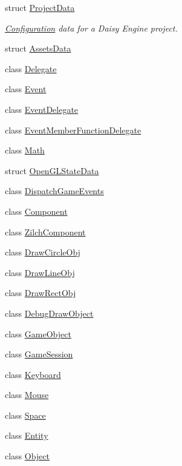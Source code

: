 \begin{DoxyCompactItemize}
struct \hyperlink{structDCEngine_1_1ProjectData}{Project\-Data}
\begin{DoxyCompactList}\small\item\em \hyperlink{structConfiguration}{Configuration} data for a Daisy Engine project. \end{DoxyCompactList}\item 
struct \hyperlink{structDCEngine_1_1AssetsData}{Assets\-Data}
\item 
class \hyperlink{classDCEngine_1_1Delegate}{Delegate}
\item 
class \hyperlink{classDCEngine_1_1Event}{Event}
\item 
class \hyperlink{classDCEngine_1_1EventDelegate}{Event\-Delegate}
\item 
class \hyperlink{classDCEngine_1_1EventMemberFunctionDelegate}{Event\-Member\-Function\-Delegate}
\item 
class \hyperlink{classDCEngine_1_1Math}{Math}
\item 
struct \hyperlink{structDCEngine_1_1OpenGLStateData}{Open\-G\-L\-State\-Data}
\item 
class \hyperlink{classDCEngine_1_1DispatchGameEvents}{Dispatch\-Game\-Events}
\item 
class \hyperlink{classDCEngine_1_1Component}{Component}
\item 
class \hyperlink{classDCEngine_1_1ZilchComponent}{Zilch\-Component}
\item 
class \hyperlink{classDCEngine_1_1DrawCircleObj}{Draw\-Circle\-Obj}
\item 
class \hyperlink{classDCEngine_1_1DrawLineObj}{Draw\-Line\-Obj}
\item 
class \hyperlink{classDCEngine_1_1DrawRectObj}{Draw\-Rect\-Obj}
\item 
class \hyperlink{classDCEngine_1_1DebugDrawObject}{Debug\-Draw\-Object}
\item 
class \hyperlink{classDCEngine_1_1GameObject}{Game\-Object}
\item 
class \hyperlink{classDCEngine_1_1GameSession}{Game\-Session}
\item 
class \hyperlink{classDCEngine_1_1Keyboard}{Keyboard}
\item 
class \hyperlink{classDCEngine_1_1Mouse}{Mouse}
\item 
class \hyperlink{classDCEngine_1_1Space}{Space}
\item 
class \hyperlink{classDCEngine_1_1Entity}{Entity}
\item 
class \hyperlink{classDCEngine_1_1Object}{Object}

\end{DoxyCompactItemize}
